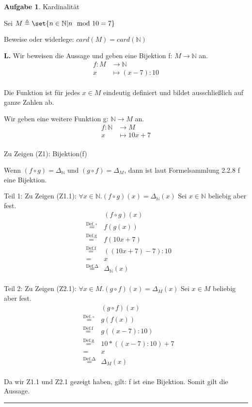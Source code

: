 \documentclass[10pt,leqno ]{article}
\DeclarePairedDelimiter\set\{\}
\newcommand\customeq[1]{\overset{\mathrm{#1}}{=}}
\theoremstyle{definition}
\newtheorem{problem}[theorem]{Aufgabe}
\newenvironment{solution}[1][L]{\begin{doublespace}\textbf{#1.}\quad }{\ \rule{0.5em}{0.5em}\end{doublespace}}
\begin{document}
\begin{problem}
Kardinalität

Sei \(M \triangleq \set{n \in \mathbb{N} | n \mod 10 = 7}\)

Beweise oder widerlege: \(card(M) = card(\mathbb{N})\)
\end{problem}
\begin{solution}
Wir beweisen die Aussage und geben eine Bijektion f: \(M \rightarrow \mathbb{N}\) an.
\begin{align*}
    f: M &\rightarrow \mathbb{N} \\
    x &\mapsto (x - 7) : 10 \\ 
\end{align*}

Die Funktion ist für jedes \(x \in M\) eindeutig definiert und bildet ausschließlich auf ganze Zahlen ab.

Wir geben eine weitere Funktion g: \(\mathbb{N} \rightarrow M\) an.
\begin{align*}
    f: \mathbb{N} &\rightarrow M \\
    x &\mapsto 10x + 7 \\ 
\end{align*}

Zu Zeigen (Z1): Bijektion(f)

Wenn \((f \circ g) = \Delta_\mathbb{N} \) und \((g \circ f) = \Delta_M \), dann ist laut Formelsammlung 2.2.8 f eine Bijektion.

Teil 1: Zu Zeigen (Z1.1): \(\forall x \in \mathbb{N} . (f \circ g)(x) = \Delta_\mathbb{N}(x) \)
Sei \(x \in \mathbb{N}\) beliebig aber fest.
\begin{equation*}
    \begin{aligned}
    && (f \circ g)(x) \\
    & \customeq{Def. \circ} & f(g(x)) \\
    & \customeq{Def. g} & f(10x + 7) \\
    & \customeq{Def. f} & ((10x + 7) - 7) : 10 \\
    & = & x \\
    & \customeq{Def. \Delta} & \Delta_\mathbb{N}(x) \\
    \end{aligned}
\end{equation*}

Teil 2: Zu Zeigen (Z2.1):  \(\forall x \in M . (g \circ f)(x) = \Delta_M(x) \)
Sei \(x \in M\) beliebig aber fest.
\begin{equation*}
    \begin{aligned}
    && (g \circ f)(x) \\
    & \customeq{Def. \circ} & g(f(x)) \\
    & \customeq{Def. f} & g((x - 7) : 10) \\
    & \customeq{Def. g} & 10*((x-7):10) + 7 \\
    & = & x \\
    & \customeq{Def. \Delta} & \Delta_M(x) \\
    \end{aligned}
\end{equation*}

Da wir Z1.1 und Z2.1 gezeigt haben, gilt: f ist eine Bijektion. Somit gilt die Aussage.
\end{solution}
\end{document}
